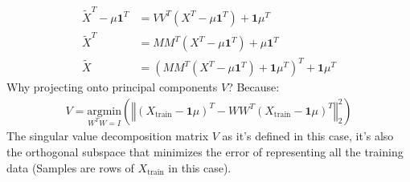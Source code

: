 \documentclass[]{article}
\begin{document}
        \begin{align*}\tag{A3.b.3}\label{eqn:A3.b.3}
            \tilde{X}^T  - \mu\mathbf{1}^T &=  VV^T(X^T- \mu\mathbf{1}^T) + \mathbf{1}\mu^T
            \\
            \tilde{X}^T &= MM^T(X^T - \mu\mathbf{1}^T) + \mu\mathbf{1}^T
            \\
            \tilde{X} &=  (MM^T(X^T - \mu\mathbf{1}^T) + \mathbf{1}\mu^T)^T + \mathbf{1}\mu^T
        \end{align*}
        Why projecting onto principal components $V$? Because: 
        \begin{align*}\tag{A3.b.4}\label{eqn:A3.b.4}
            V = \underset{W^TW = I}{\text{argmin}}\left(
                \left\Vert
                    (X_\text{train} - \mathbf{1}\mu)^T - WW^T(X_\text{train} - \mathbf{1}\mu)^T
                \right\Vert_2^2
            \right)
        \end{align*}
        The singular value decomposition matrix $V$ as it's defined in this case, it's also the orthogonal subspace that minimizes the error of representing all the training data (Samples are rows of $X_\text{train}$ in this case). 
\end{document}
